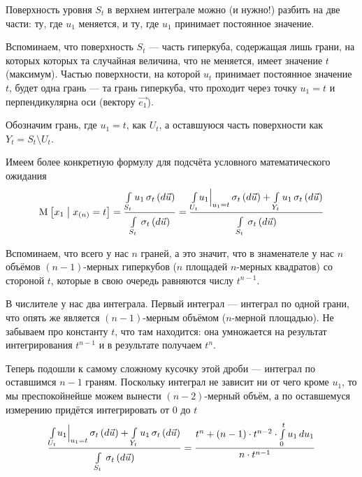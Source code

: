 Поверхность уровня $S_t$ в верхнем интеграле можно (и нужно!)
разбить на две части: ту, где $u_1$ меняется, и ту, где $u_1$
принимает постоянное значение.

Вспоминаем, что поверхность $S_t$ --- часть гиперкуба,
содержащая лишь грани, на которых которых та случайная величина,
что не меняется, имеет значение $t$ (максимум).
Частью поверхности, на которой $u_t$ принимает постоянное значение $t$,
будет одна грань --- та грань гиперкуба, что проходит через точку $u_1 = t$
и перпендикулярна оси (вектору $\vec{e_1}$).

Обозначим грань, где $u_1 = t$, как $U_t$,
а оставшуюся часть поверхности как $Y_t = S_t \setminus U_t$.

Имеем более конкретную формулу для подсчёта условного математического ожидания
\begin{align*}
    \Mean{x_1 \mcond x_{\left( n \right)} = t}
    = \frac{\integrall{S_t}{\sigma_{t}\left(d\vec{u} \right)}{u_1}}{
        \integrall{S_t}{\sigma_{t}\left(d\vec{u} \right)}{}}
    = \frac{\integrall{U_t}{\sigma_{t}\left(d\vec{u} \right)}{
                \Bigl. u_1 \Bigr|_{u_1 = t}}
            + \integrall{Y_t}{\sigma_{t}\left(d\vec{u} \right)}{
                u_1}}{
        \integrall{S_t}{\sigma_{t}\left(d\vec{u} \right)}{}}
\end{align*}

Вспоминаем, что всего у нас $n$ граней, а это значит, что в знаменателе
у нас $n$ объёмов $\left( n-1 \right)$-мерных гиперкубов
($n$ площадей $n$-мерных квадратов)
со стороной $t$, которые в свою очередь равняются числу $t^{n-1}$.

В числителе у нас два интеграла.
Первый интеграл --- интеграл по одной грани, что опять же является
$\left( n-1 \right)$-мерным объёмом ($n$-мерной площадью).
Не забываем про константу $t$, что там находится: она умножается
на результат интегрирования $t^{n-1}$ и в результате получаем $t^n$.

Теперь подошли к самому сложному кусочку этой дроби ---
интеграл по оставшимся $n-1$ граням.
Поскольку интеграл не зависит ни от чего кроме $u_1$, то мы преспокойнейше
можем вынести $\left( n-2 \right)$-мерный объём, а по оставшемуся измерению
придётся интегрировать от $0$ до $t$
$$\frac{\integrall{U_t}{\sigma_{t}\left(d\vec{u} \right)}{
        \Bigl. u_1 \Bigr|_{u_1 = t}}
            + \integrall{Y_t}{\sigma_{t}\left(d\vec{u} \right)}{
                u_1}}{
        \integrall{S_t}{\sigma_{t}\left(d\vec{u} \right)}{}}
    = \frac{t^n + \left( n-1 \right) \cdot t^{n-2}
        \cdot \integral{0}{t}{u_1}{u_1}}{n \cdot t^{n-1}}$$

